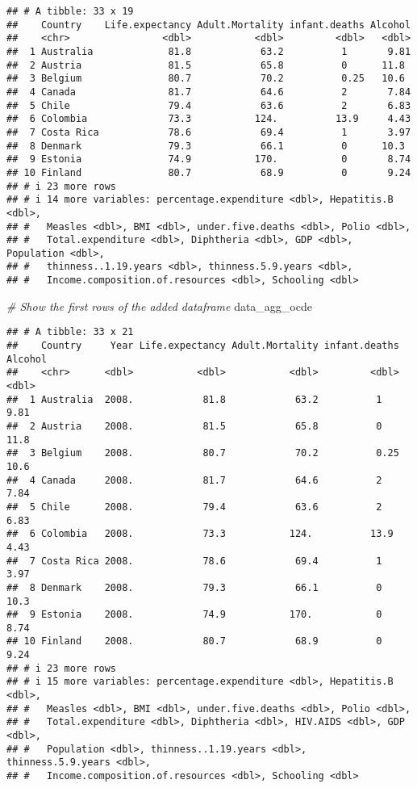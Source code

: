 \documentclass[
]{article}
\newenvironment{Shaded}{\begin{snugshade}}{\end{snugshade}}
\newcommand{\CommentTok}[1]{\textcolor[rgb]{0.56,0.35,0.01}{\textit{#1}}}
\newcommand{\NormalTok}[1]{#1}
\begin{document}
\begin{verbatim}
## # A tibble: 33 x 19
##    Country    Life.expectancy Adult.Mortality infant.deaths Alcohol
##    <chr>                <dbl>           <dbl>         <dbl>   <dbl>
##  1 Australia             81.8            63.2          1       9.81
##  2 Austria               81.5            65.8          0      11.8 
##  3 Belgium               80.7            70.2          0.25   10.6 
##  4 Canada                81.7            64.6          2       7.84
##  5 Chile                 79.4            63.6          2       6.83
##  6 Colombia              73.3           124.          13.9     4.43
##  7 Costa Rica            78.6            69.4          1       3.97
##  8 Denmark               79.3            66.1          0      10.3 
##  9 Estonia               74.9           170.           0       8.74
## 10 Finland               80.7            68.9          0       9.24
## # i 23 more rows
## # i 14 more variables: percentage.expenditure <dbl>, Hepatitis.B <dbl>,
## #   Measles <dbl>, BMI <dbl>, under.five.deaths <dbl>, Polio <dbl>,
## #   Total.expenditure <dbl>, Diphtheria <dbl>, GDP <dbl>, Population <dbl>,
## #   thinness..1.19.years <dbl>, thinness.5.9.years <dbl>,
## #   Income.composition.of.resources <dbl>, Schooling <dbl>
\end{verbatim}

\begin{Shaded}
\begin{Highlighting}[]
\CommentTok{\# Show the first rows of the added dataframe}
\NormalTok{data\_agg\_ocde}
\end{Highlighting}
\end{Shaded}

\begin{verbatim}
## # A tibble: 33 x 21
##    Country     Year Life.expectancy Adult.Mortality infant.deaths Alcohol
##    <chr>      <dbl>           <dbl>           <dbl>         <dbl>   <dbl>
##  1 Australia  2008.            81.8            63.2          1       9.81
##  2 Austria    2008.            81.5            65.8          0      11.8 
##  3 Belgium    2008.            80.7            70.2          0.25   10.6 
##  4 Canada     2008.            81.7            64.6          2       7.84
##  5 Chile      2008.            79.4            63.6          2       6.83
##  6 Colombia   2008.            73.3           124.          13.9     4.43
##  7 Costa Rica 2008.            78.6            69.4          1       3.97
##  8 Denmark    2008.            79.3            66.1          0      10.3 
##  9 Estonia    2008.            74.9           170.           0       8.74
## 10 Finland    2008.            80.7            68.9          0       9.24
## # i 23 more rows
## # i 15 more variables: percentage.expenditure <dbl>, Hepatitis.B <dbl>,
## #   Measles <dbl>, BMI <dbl>, under.five.deaths <dbl>, Polio <dbl>,
## #   Total.expenditure <dbl>, Diphtheria <dbl>, HIV.AIDS <dbl>, GDP <dbl>,
## #   Population <dbl>, thinness..1.19.years <dbl>, thinness.5.9.years <dbl>,
## #   Income.composition.of.resources <dbl>, Schooling <dbl>
\end{verbatim}
\end{document}
